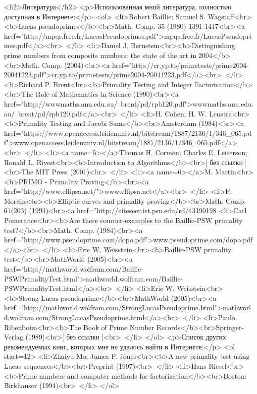 <h2>Литература</h2>
<p>Использованная мной литература, полностью доступная в Интернете:</p>
<ol>
<li>Robert Baillie; Samuel S. Wagstaff<br><b>Lucas pseudoprimes</b><br>Math. Comp. 35 (1980) 1391-1417<br><a href="http://mpqs.free.fr/LucasPseudoprimes.pdf">mpqs.free.fr/LucasPseudoprimes.pdf</a><br> </li>
<li>Daniel J. Bernstein<br><b>Distinguishing prime numbers from composite numbers: the state of the art in 2004</b><br>Math. Comp. (2004)<br><a href="http://cr.yp.to/primetests/prime2004-20041223.pdf">cr.yp.to/primetests/prime2004-20041223.pdf</a><br> </li>
<li>Richard P. Brent<br><b>Primality Testing and Integer Factorisation</b><br>The Role of Mathematics in Science (1990)<br><a href="http://wwwmaths.anu.edu.au/~brent/pd/rpb120.pdf">wwwmaths.anu.edu.au/~brent/pd/rpb120.pdf</a><br> </li>
<li>H. Cohen; H. W. Lenstra<br><b>Primality Testing and Jacobi Sums</b><br>Amsterdam (1984)<br><a href="https://www.openaccess.leidenuniv.nl/bitstream/1887/2136/1/346_065.pdf">www.openaccess.leidenuniv.nl/bitstream/1887/2136/1/346_065.pdf</a><br> </li>
<li><a name=5></a>Thomas H. Cormen; Charles E. Leiserson; Ronald L. Rivest<br><b>Introduction to Algorithms</b><br>[ без ссылки ]<br>The MIT Press (2001)<br> </li>
<li><a name=6></a>M. Martin<br><b>PRIMO - Primality Proving</b><br><a href="http://www.ellipsa.net/">www.ellipsa.net</a><br> </li>
<li>F. Morain<br><b>Elliptic curves and primality proving</b><br>Math. Comp. 61(203) (1993)<br><a href="http://citeseer.ist.psu.edu/rd/43190198%
<li>Carl Pomerance<br><b>Are there counter-examples to the Baillie-PSW primality test?</b><br>Math. Comp. (1984)<br><a href="http://www.pseudoprime.com/dopo.pdf">www.pseudoprime.com/dopo.pdf</a><br> </li>
<li>Eric W. Weisstein<br><b>Baillie-PSW primality test</b><br>MathWorld (2005)<br><a href="http://mathworld.wolfram.com/Baillie-PSWPrimalityTest.html">mathworld.wolfram.com/Baillie-PSWPrimalityTest.html</a><br> </li>
<li>Eric W. Weisstein<br><b>Strong Lucas pseudoprime</b><br>MathWorld (2005)<br><a href="http://mathworld.wolfram.com/StrongLucasPseudoprime.html">mathworld.wolfram.com/StrongLucasPseudoprime.html</a><br> </li>
<li>Paulo Ribenboim<br><b>The Book of Prime Number Records</b><br>Springer-Verlag (1989)<br>[ без ссылки ]<br> </li>
</ol>
<p>Список других рекомендуемых книг, которых мне не удалось найти в Интернете:</p>
<ol start=12>
<li>Zhaiyu Mo; James P. Jones<br><b>A new primality test using Lucas sequences</b><br>Preprint (1997)<br> </li>
<li>Hans Riesel<br><b>Prime numbers and computer methods for factorization</b><br>Boston: Birkhauser (1994)<br> </li>
</ol>